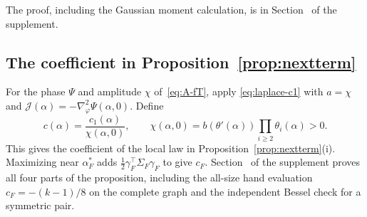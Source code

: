 The proof, including the Gaussian moment calculation, is in
Section~ of the supplement.

\subsection{The coefficient in Proposition~\ref{prop:nextterm}}\label{app:nextterm}

For the phase $\Psi$ and amplitude $\chi$ of~\eqref{eq:A-fT}, apply
\eqref{eq:laplace-c1} with $a=\chi$ and
$\mathcal J(\alpha)=-\nabla^2_\varphi\Psi(\alpha,0)$. Define
\begin{equation}\label{eq:c-alpha}
c(\alpha)=\frac{c_1(\alpha)}{\chi(\alpha,0)},\qquad
\chi(\alpha,0)=b(\theta'(\alpha))\prod_{i\ge2}\theta_i(\alpha)>0 .
\end{equation}
This gives the coefficient of the local law in Proposition~\ref{prop:nextterm}(i).
Maximizing near $\alpha_F^*$ adds
$\frac12\gamma_F^\top\Sigma_F\gamma_F$ to give $c_F$. Section~
of the supplement proves all four parts of the proposition, including the all-size
hand evaluation $c_F=-(k-1)/8$ on the complete graph and the independent Bessel check
for a symmetric pair.
